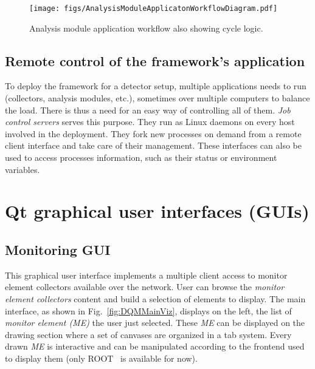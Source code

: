 \documentclass[journal]{IEEEtran}
\begin{document}
\begin{figure}[htbp]
  \begin{center}
    \texttt{[image: figs/AnalysisModuleApplicatonWorkflowDiagram.pdf]}
    \caption{\label{fig:DQMCycleSystem} Analysis module application workflow also showing cycle logic.}
  \end{center}
\end{figure}

\subsection{Remote control of the framework's application}
To deploy the framework for a detector setup, multiple applications needs to run (collectors, analysis modules, etc.), sometimes over multiple computers to balance the load. There is thus a need for an easy way of controlling all of them. \textit{Job control servers} serves this purpose. They run as Linux daemons on every host involved in the deployment. They fork new processes on demand from a remote client interface and take care of their management. These interfaces can also be used to access processes information, such as their status or environment variables.

\section{Qt \cite{QT} graphical user interfaces (GUIs)}

\subsection{Monitoring GUI}

This graphical user interface implements a multiple client access to monitor element collectors available over the network. User can browse the \textit{monitor element collectors} content and build a selection of elements to display. The main interface, as shown in Fig.~\ref{fig:DQMMainViz}, displays on the left, the list of \textit{monitor element (ME)} the user just selected. These \textit{ME} can be displayed on the drawing section where a set of canvases are organized in a tab system. Every drawn \textit{ME} is interactive and can be manipulated according to the frontend used to display them (only ROOT~\cite{ROOT} is available for now).
\end{document}
